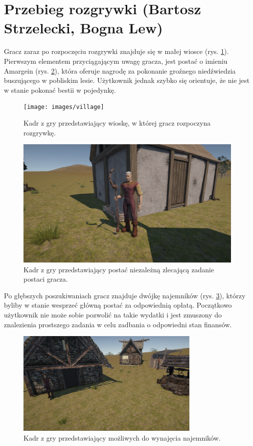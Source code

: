 \section{Przebieg rozgrywki (Bartosz Strzelecki, Bogna Lew)}\label{s:rozgrywka}
Gracz zaraz po rozpoczęciu rozgrywki znajduje się w małej wiosce (rys. \ref{fig:village}). Pierwszym
elementem przyciągającym uwagę gracza, jest postać o imieniu Amargein (rys. \ref{fig:npc}), która oferuje
nagrodę za pokonanie groźnego niedźwiedzia buszującego w pobliskim lesie. Użytkownik jednak
szybko się orientuje, że nie jest w stanie pokonać bestii w pojedynkę.

\begin{figure}[h]
\centering
\texttt{[image: images/village]}
\caption{Kadr z gry przedstawiający wioskę, w której gracz rozpoczyna rozgrywkę.}
\label{fig:village}
\end{figure}
\FloatBarrier

\begin{figure}[h]
\centering
\includegraphics[width=1\textwidth]{images/npc1}
\caption{Kadr z gry przedstawiający postać niezależną zlecającą zadanie postaci gracza.}
\label{fig:npc}
\end{figure}
\FloatBarrier

Po głębszych poszukiwaniach gracz znajduje dwójkę najemników (rys. \ref{fig:mercs}), którzy byliby w stanie
wesprzeć główną postać za odpowiednią opłatą. Początkowo użytkownik nie może sobie
pozwolić na takie wydatki i jest zmuszony do znalezienia prostszego zadania
w celu zadbania o odpowiedni stan finansów.

\begin{figure}[h]
\centering
\includegraphics[width=0.8\textwidth]{images/mercs}
\caption{Kadr z gry przedstawiający możliwych do wynajęcia najemników.}
\label{fig:mercs}
\end{figure}
\FloatBarrier

